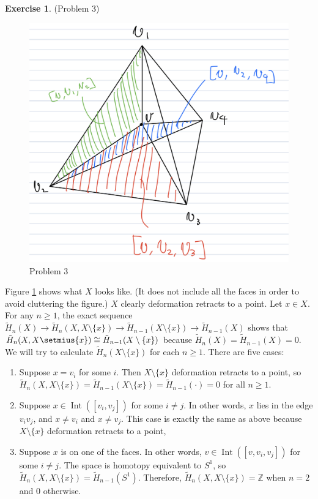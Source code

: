 \documentclass[12pt, psamsfonts]{amsart}
\theoremstyle{definition}
\newtheorem*{exer}{Exercise}
\theoremstyle{remark}
\DeclareMathOperator{\Int}{Int}
\numberwithin{equation}{section}
\begin{document}
\begin{exer}{(Problem 3)}
  \begin{figure}[!htb]
    \includegraphics[width=.5\linewidth]{problem3.jpeg}
    \caption{Problem 3}
    \label{fig:problem3}
  \end{figure}
  Figure \ref{fig:problem3} shows what $X$ looks like.
  (It does not include all the faces in order to avoid cluttering the figure.)
  $X$ clearly deformation retracts to a point.
  Let $x \in X$.
  For any $n \geq 1$, the exact sequence $\tilde{H}_n(X) \rightarrow \tilde{H}_n(X, X \setminus \{ x \}) \rightarrow \tilde{H}_{n - 1}(X \setminus \{ x \}) \rightarrow \tilde{H}_{n - 1}(X)$ shows that $\tilde{H}_n(X, X \setmius \{ x \}) \cong \tilde{H}_{n - 1}(X \setminus \{ x \})$ because $\tilde{H}_n(X) = \tilde{H}_{n - 1}(X) = 0$.
  We will try to calculate $\tilde{H}_n(X \setminus \{ x \})$ for each $n \geq 1$.
  There are five cases:
  \begin{enumerate}
    \item 
      Suppose $x = v_i$ for some $i$.
      Then $X \setminus \{ x \}$ deformation retracts to a point, so $\tilde{H}_n(X, X \setminus \{ x \}) = \tilde{H}_{n - 1}(X \setminus \{ x \}) = \tilde{H}_{n - 1}(\cdot) = 0$ for all $n \geq 1$.
    \item
      Suppose $x \in \Int([v_i, v_j])$ for some $i \ne j$.
      In other words, $x$ lies in the edge $v_iv_j$, and $x \ne v_i$ and $x \ne v_j$.
      This case is exactly the same as above because $X \setminus \{ x \}$ deformation retracts to a point,
    \item
      Suppose $x$ is on one of the faces.
      In other words, $v \in \Int([v, v_i, v_j])$ for some $i \ne j$.
      The space is homotopy equivalent to $S^1$, so $\tilde{H}_n(X, X \setminus \{ x \}) = \tilde{H}_{n - 1}(S^1)$.
      Therefore, $\tilde{H}_n(X, X \setminus \{ x \}) = \mathbb{Z}$ when $n = 2$ and 0 otherwise.

\end{enumerate}
\end{exer}
\end{document}
